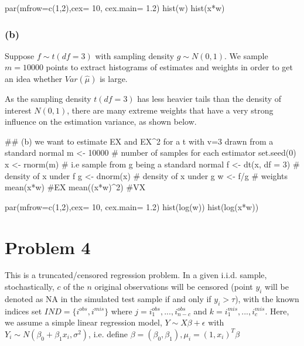 \documentclass{article}
\begin{document}
par(mfrow=c(1,2),cex= 10, cex.main= 1.2)
hist(w)
hist(x*w)


\subsubsection*{(b)}
\hspace{12 pt} Suppose $f\sim t(df=3)$ with sampling density $g\sim N(0,1)$. We sample $m=10000$ points
to extract histograms of estimates and weights in order to get an idea whether $Var(\hat\mu)$ is large.

As the sampling density $t(df=3)$ has less heavier tails than the density of interest $N(0,1)$, there are
many extreme weights that have a very strong influence on the estimation variance, as shown below.


## (b) we want to estimate EX and EX^2 for a t with v=3 drawn from a standard normal
m <- 10000 # number of samples for each estimator
set.seed(0)
x <- rnorm(m)  # i.e sample from g being a standard normal
f <- dt(x, df = 3)  # density of x under f
g <- dnorm(x)  # density of x under g
w <- f/g  # weights
mean(x*w) #EX
mean((x*w)^2) #VX

par(mfrow=c(1,2),cex= 10, cex.main= 1.2)
hist(log(w))
hist(log(x*w))



\newpage
\section*{Problem 4}

\hspace{12 pt} This is a truncated/censored regression problem. In a given i.i.d. sample, stochastically, $c$ of the $n$ original observations
will be censored (point $y_i$ will be denoted as NA in the simulated test sample if and only if $y_i > \tau$), with the known 
indices set $IND=\{i^{obs},i^{mis}\}$ where $j=i^{obs}_1,...,i^{obs}_{n-c}$ and $k=i^{mis}_1,...,i^{mis}_c$. 
Here, we assume a simple linear regression model, 
$Y\sim X\beta + \epsilon$ with $Y_i\sim N(\beta_0+\beta_1x_i,\sigma^2)$, i.e. define $\beta=(\beta_0,\beta_1), \mu_i=(1, x_i)^T\beta$
\end{document}
